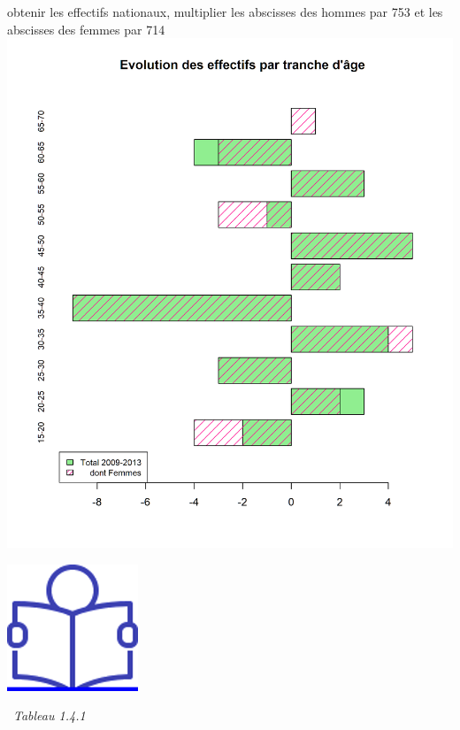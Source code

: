 obtenir les effectifs nationaux, multiplier les abscisses des hommes par
753 et les abscisses des femmes par 714\newpage
\includegraphics{altair_files/figure-latex/unnamed-chunk-23-3.png}

\href{../Docs/Notices/fiche_3.odt}{\includegraphics{icones/Notice.png}}

\newpage

~\emph{Tableau 1.4.1}

